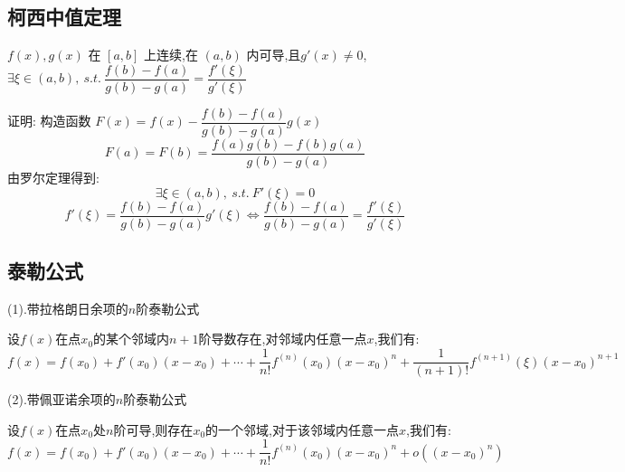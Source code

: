 \subsection{柯西中值定理}
\begin{theorem}[柯西中值定理]

	$f(x),g(x)$ 在 $[a,b]$ 上连续,在 $(a,b)$ 内可导,且$g'(x)\neq 0$,$\exists \xi\in(a,b),\ s.t.\ \dfrac{f(b)-f(a)}{g(b)-g(a)}=\dfrac{f'(\xi)}{g'(\xi)}$

	证明: 构造函数 $F(x)=f(x)-\dfrac{f(b)-f(a)}{g(b)-g(a)}g(x)$
	$$F(a)=F(b)=\frac{f(a)g(b)-f(b)g(a)}{g(b)-g(a)}$$
	由罗尔定理得到: $$\exists \xi\in(a,b),\ s.t.\ F'(\xi)=0$$
	$$ f'(\xi)=\frac{f(b)-f(a)}{g(b)-g(a)}g'(\xi)\Leftrightarrow  \frac{f(b)-f(a)}{g(b)-g(a)}=\frac{f'(\xi)}{g'(\xi)}$$
\end{theorem}
\subsection{泰勒公式}
\begin{theorem}[泰勒公式]

	(1).带拉格朗日余项的$n$阶泰勒公式

	设$f(x)$在点$x_{0}$的某个邻域内$n+1$阶导数存在,对邻域内任意一点$x$,我们有:
	$$f(x)=f(x_{0})+f'(x_{0})(x-x_{0})+\cdots+\frac{1}{n!}f^{(n)}(x_{0})(x-x_{0})^{n}+\frac{1}{(n+1)!}f^{(n+1)}(\xi)(x-x_{0})^{n+1}$$

	(2).带佩亚诺余项的$n$阶泰勒公式

	设$f(x)$在点$x_{0}$处$n$阶可导,则存在$x_{0}$的一个邻域,对于该邻域内任意一点$x$,我们有:
	$$f(x)=f(x_{0})+f'(x_{0})(x-x_{0})+\cdots+\frac{1}{n!}f^{(n)}(x_{0})(x-x_{0})^{n}+o((x-x_{0})^n)$$
\end{theorem}
